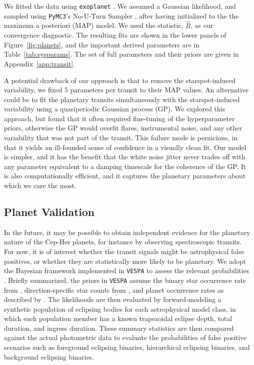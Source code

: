 \documentclass[12pt,twocolumn]{aastex63}
\begin{document}
We fitted the data using \texttt{exoplanet}
\citep{exoplanet:exoplanet}.  We assumed a Gaussian likelihood, and
sampled using \texttt{PyMC3}'s No-U-Turn Sampler
\citep{hoffman_no-u-turn_2014}, after having initialized to the the
maximum a posteriori (MAP) model.  We used the
\citet{gelman_inference_1992} statistic, $\hat{R}$, as our convergence
diagnostic.  The resulting fits are shown in the lower panels of
Figure~\ref{fig:planets}, and the important derived parameters are in
Table~\ref{tab:sysparams}.  The set of full parameters and their
priors are given in Appendix~\ref{app:transit}.

A potential drawback of our approach is that to remove
the starspot-induced variability, we fixed 5 
parameters per transit to their MAP values.
An alternative could be to fit the
planetary transits simultaneously with the starspot-induced
variability using a quasiperiodic Gaussian process (GP).  We explored
this approach, but found that it often required fine-tuning of the
hyperparameter priors, otherwise the GP would overfit flares,
instrumental noise, and any other variability that was not part of the
transit.  This failure mode is pernicious, in that it yields an
ill-founded sense of confidence in a visually clean fit.  Our model is
simpler, and it has the benefit that the white noise jitter never
trades off with any parameter equivalent to a damping timescale for
the coherence of the GP.  It is also computationally efficient, and it
captures the planetary parameters about which we care the most.


\subsection{Planet Validation}

In the future, it may be possible to obtain independent evidence for
the planetary nature of the Cep-Her planets, for instance by observing
spectroscopic transits.  For now,
it is of interest whether the transit signals might be astrophysical
false positives, or whether they are statistically more likely to be
planetary.  We adopt the Bayesian framework implemented in
\texttt{VESPA} to assess the relevant probabilities
\citep{morton_efficient_2012,vespa_2015}.  Briefly summarized, the
priors in \texttt{VESPA} assume the binary star occurrence rate from
\citet{raghavan_survey_2010}, direction-specific star counts from
\citet{girardi_star_2005}, and planet occurrence rates as described by
\citet[][Section~3.4]{morton_efficient_2012}.  The likelihoods are
then evaluated by forward-modeling a synthetic population of eclipsing
bodies for each astrophysical model class, in which each population
member has a known trapezoidal eclipse depth, total duration, and
ingress duration.  These summary statistics are then compared against
the actual photometric data to evaluate the probabilities of false
positive scenarios such as foreground eclipsing binaries, hierarchical
eclipsing binaries, and background eclipsing binaries.
\end{document}
